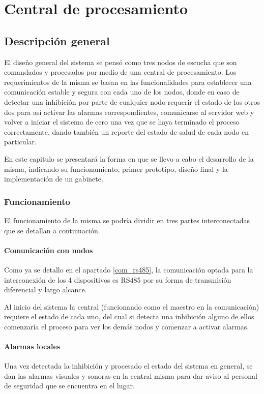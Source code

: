 \chapter{Central de procesamiento}
\section{Descripción general}
\par El diseño general del sistema se pensó como tres nodos de escucha que son comandados y
procesados por medio de una central de procesamiento. Los requerimientos de la misma se
basan en las funcionalidades para establecer una comunicación estable y segura con cada uno
de los nodos, donde en caso de detectar una inhibición por parte de cualquier nodo requerir
el estado de los otros dos para así activar las alarmas correspondientes, comunicarse al
servidor web y volver a iniciar el sistema de cero una vez que se haya terminado el proceso
correctamente, dando también un reporte del estado de salud de cada nodo en particular.
\par En este capitulo se presentará la forma en que se llevo a cabo el desarrollo de la
misma, indicando su funcionamiento, primer prototipo, diseño final y la implementación de
un gabinete. 
\subsection{Funcionamiento}
\par El funcionamiento de la misma se podría dividir en tres partes interconectadas que se detallan a continuación.
\subsubsection{Comunicación con nodos}
\par Como ya se detallo en el apartado \ref{com_rs485}, la comunicación optada para la interconexión de los 4 dispositivos es RS485 por su forma de transmisión diferencial y largo alcance. 
\par Al inicio del sistema la central (funcionando como el maestro en la comunicación) requiere el estado de cada uno, del cual si detecta una inhibición alguno de ellos comenzaría el proceso para ver los demás nodos y comenzar a activar alarmas.

\subsubsection{Alarmas locales}
\par Una vez detectada la inhibición y procesado el estado del sistema en general, se dan las alarmas visuales y sonoras en la central misma para dar aviso al personal de seguridad que se encuentra en el lugar. 

